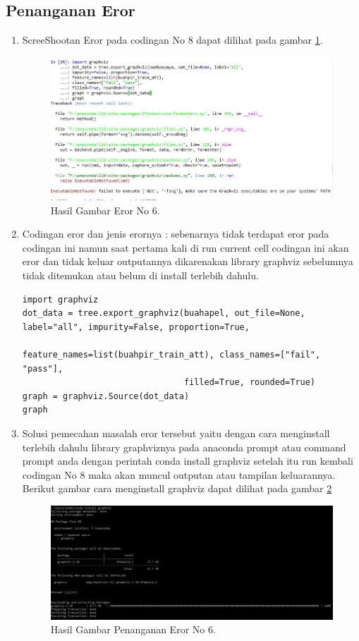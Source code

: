 \subsection{Penanganan Eror}
\begin{enumerate}
\item ScreeShootan Eror pada codingan No 8 dapat dilihat pada gambar \ref{21}.
\subitem 
\begin{figure}[ht]
		\centerline{\includegraphics[width=1\textwidth]{figures/huda/eror6.JPG}}
		\caption{Hasil Gambar Eror No 6.}
		\label{21}
\end{figure}
\item Codingan eror dan jenis erornya : sebenarnya tidak terdapat eror pada codingan ini namun saat pertama kali di run current cell codingan ini akan eror dan tidak keluar outputannya dikarenakan library graphviz sebelumnya tidak ditemukan atau belum di install terlebih dahulu.
\subitem 
\begin{verbatim}
import graphviz
dot_data = tree.export_graphviz(buahapel, out_file=None, label="all", impurity=False, proportion=True,
                                feature_names=list(buahpir_train_att), class_names=["fail", "pass"], 
                                filled=True, rounded=True)
graph = graphviz.Source(dot_data)
graph
\end{verbatim}
\item Solusi pemecahan masalah eror tersebut yaitu dengan cara menginstall terlebih dahulu library graphviznya pada anaconda prompt atau command prompt anda dengan perintah conda install graphviz setelah itu run kembali codingan No 8 maka akan muncul outputan atau tampilan keluarannya.
\subitem Berikut gambar cara menginstall graphviz dapat dilihat pada gambar \ref{22}
\begin{figure}[ht]
		\centerline{\includegraphics[width=1\textwidth]{figures/huda/penangananeror6.JPG}}
		\caption{Hasil Gambar Penanganan Eror No 6.}
		\label{22}
\end{figure}
\end{enumerate}


